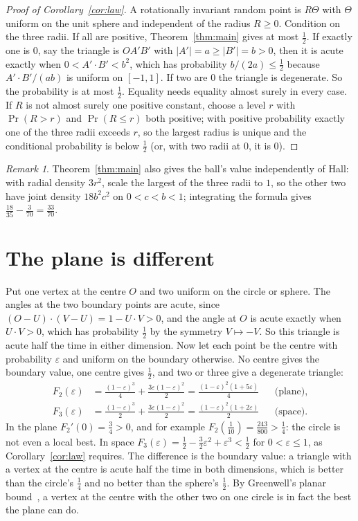 \documentclass[11pt]{article}
\theoremstyle{remark}
\newtheorem*{remark}{Remark}
\begin{document}
\begin{proof}[Proof of Corollary~\ref{cor:law}]
A rotationally invariant random point is $R\Theta$ with $\Theta$ uniform on the unit sphere and independent of
the radius $R\ge0$. Condition on the three radii. If all are positive, Theorem~\ref{thm:main} gives at most
$\frac12$. If exactly one is $0$, say the triangle is $OA'B'$ with $|A'|=a\ge|B'|=b>0$, then it is acute exactly
when $0<A'\cdot B'<b^2$, which has probability $b/(2a)\le\frac12$ because $A'\cdot B'/(ab)$ is uniform on
$[-1,1]$. If two are $0$ the triangle is degenerate. So the probability is at most $\frac12$. Equality needs
equality almost surely in every case. If $R$ is not almost surely one positive constant, choose a level $r$
with $\Pr(R>r)$ and $\Pr(R\le r)$ both positive; with positive probability exactly one of the three radii exceeds
$r$, so the largest radius is unique and the conditional probability is below $\frac12$ (or, with two radii at
$0$, it is $0$).
\end{proof}

\begin{remark}
Theorem~\ref{thm:main} also gives the ball's value independently of Hall: with radial density $3r^2$, scale the
largest of the three radii to $1$, so the other two have joint density $18b^2c^2$ on $0<c<b<1$; integrating the
formula gives $\frac{18}{35}-\frac3{70}=\frac{33}{70}$.
\end{remark}

\section{The plane is different}\label{sec:plane}

Put one vertex at the centre $O$ and two uniform on the circle or sphere. The angles at the two boundary points
are acute, since $(O-U)\cdot(V-U)=1-U\cdot V>0$, and the angle at $O$ is acute exactly when $U\cdot V>0$, which
has probability $\frac12$ by the symmetry $V\mapsto-V$. So this triangle is acute half the time in either
dimension. Now let each point be the centre with probability $\varepsilon$ and uniform on the boundary
otherwise. No centre gives the boundary value, one centre gives $\frac12$, and two or three give a degenerate
triangle:
\begin{align*}
F_2(\varepsilon)&=\frac{(1-\varepsilon)^3}4+\frac{3\varepsilon(1-\varepsilon)^2}2=\frac{(1-\varepsilon)^2(1+5\varepsilon)}4
&&\text{(plane)},\\
F_3(\varepsilon)&=\frac{(1-\varepsilon)^3}2+\frac{3\varepsilon(1-\varepsilon)^2}2=\frac{(1-\varepsilon)^2(1+2\varepsilon)}2
&&\text{(space)}.
\end{align*}
In the plane $F_2'(0)=\frac34>0$, and for example $F_2(\frac1{10})=\frac{243}{800}>\frac14$: the circle is not
even a local best. In space $F_3(\varepsilon)=\frac12-\frac32\varepsilon^2+\varepsilon^3<\frac12$ for
$0<\varepsilon\le1$, as Corollary~\ref{cor:law} requires. The difference is the boundary value: a triangle with a
vertex at the centre is acute half the time in both dimensions, which is better than the circle's $\frac14$ and
no better than the sphere's $\frac12$. By Greenwell's planar bound~\cite{Gre26}, a vertex at the centre with the
other two on one circle is in fact the best the plane can do.
\end{document}
